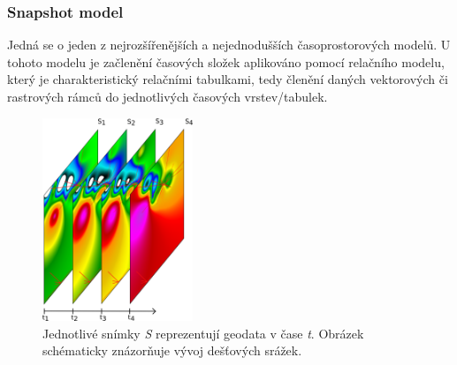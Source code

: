 \documentclass[a4paper,12pt,oneside]{report}
\begin{document}
\subsubsection*{Snapshot model}
Jedná se o jeden z nejrozšířenějších a nejednodušších časoprostorových modelů. U tohoto modelu je začlenění časových složek aplikováno pomocí relačního modelu, který je charakteristický relačními tabulkami, tedy členění daných vektorových či rastrových rámců do jednotlivých časových vrstev/tabulek. 

\begin{figure}[h!]
    \centering
    \includegraphics[width=0.4\textwidth]{./img/temporal/snapshot.png}
    \caption[Snapshot model]{Jednotlivé snímky \emph{S} reprezentují  geodata v čase \emph{t}. Obrázek schématicky znázorňuje vývoj dešťových srážek.  \centering \footnotemark }
        \label{fig:snapshot}
 \end{figure}   
\end{document}
